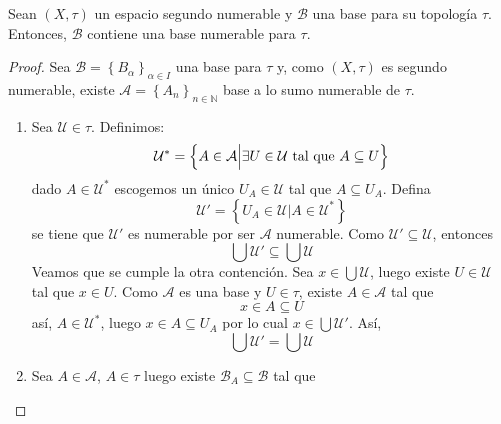 \documentclass[12pt]{report}
\theoremstyle{largebreak}
\begin{document}
    \begin{propo}
        Sean $(X,\tau)$ un espacio segundo numerable y $\mathcal{B}$ una base para su topología $\tau$. Entonces, $\mathcal{B}$ contiene una base numerable para $\tau$.
    \end{propo}

    \begin{proof}
        Sea $\mathcal{B}=\left\{B_\alpha\right\}_{\alpha\in I}$ una base para $\tau$ y, como $(X,\tau)$ es segundo numerable, existe $\mathcal{A}=\left\{A_n\right\}_{ n\in\mathbb{N}}$ base a lo sumo numerable de $\tau$.
        \renewcommand{\theenumi}{\alph{enumi}}
        \begin{enumerate}
            \item Sea $\mathcal{U}\in\tau$. Definimos:
            \begin{equation*}
                \mathcal{U}^*=\left\{A\in\mathcal{A}\Big|\exists U\in\mathcal{U}\textup{ tal que }A\subseteq U \right\}
            \end{equation*}
            dado $A\in\mathcal{U}^*$ escogemos un único $U_A\in\mathcal{U}$ tal que $A\subseteq U_A$. Defina
            \begin{equation*}
                \mathcal{U}'=\left\{U_A\in\mathcal{U} \Big|A\in\mathcal{U}^* \right\}
            \end{equation*}
            se tiene que $\mathcal{U}'$ es numerable por ser $\mathcal{A}$ numerable. Como $\mathcal{U}'\subseteq\mathcal{U}$, entonces
            \begin{equation*}
                \bigcup\mathcal{U}'\subseteq\bigcup\mathcal{U}
            \end{equation*}
            Veamos que se cumple la otra contención. Sea $x\in\bigcup\mathcal{U}$, luego existe $U\in\mathcal{U}$ tal que $x\in U$. Como $\mathcal{A}$ es una base y $U\in\tau$, existe $A\in \mathcal{A}$ tal que
            \begin{equation*}
                x\in A\subseteq U
            \end{equation*}
            así, $A\in\mathcal{U}^*$, luego $x\in A\subseteq U_A$ por lo cual $x\in\bigcup\mathcal{U}'$. Así,
            \begin{equation*}
                \bigcup\mathcal{U}'=\bigcup\mathcal{U}
            \end{equation*}
            \item Sea $A\in\mathcal{A}$, $A\in\tau$ luego existe $\mathcal{B}_A\subseteq\mathcal{B}$ tal que
            \begin{equation*}

\end{equation*}
\end{enumerate}
\end{proof}
\end{document}
